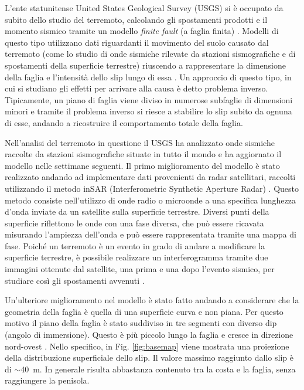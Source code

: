 L'ente statunitense United States Geological Survey (USGS) si è occupato da subito dello studio del terremoto, calcolando gli spostamenti prodotti e il momento sismico tramite un modello \textit{finite fault} (a faglia finita) \citep{usgs2025qw60finitefault}.
Modelli di questo tipo utilizzano dati riguardanti il movimento del suolo causato dal terremoto (come lo studio di onde sismiche rilevate da stazioni sismografiche e di spostamenti della superficie terrestre) riuscendo  a rappresentare la dimensione della faglia e l'intensità dello slip lungo di essa \citep{usgs_finite_fault}. Un approccio di questo tipo, in cui si studiano gli effetti per arrivare alla causa è detto problema inverso. Tipicamente, un piano di faglia viene diviso in numerose subfaglie di dimensioni minori e tramite il problema inverso si riesce a stabilire lo slip subito da ognuna di esse, andando a ricostruire il comportamento totale della faglia.

Nell'analisi del terremoto in questione il USGS ha analizzato onde sismiche raccolte da stazioni sismografiche situate in tutto il mondo e ha aggiornato il modello nelle settimane seguenti. Il primo miglioramento del modello è stato realizzato andando ad implementare dati provenienti da radar satellitari, raccolti utilizzando il metodo inSAR (Interferometric Synthetic Aperture Radar) \citep{hubbard2025kamchatkaupdates}. Questo metodo consiste nell'utilizzo di onde radio o microonde a una specifica lunghezza d'onda inviate da un satellite sulla superficie terrestre. Diversi punti della superficie riflettono le onde con una fase diversa, che può essere ricavata misurando l'ampiezza dell'onda e può essere rappresentata tramite una mappa di fase. Poiché un terremoto è un evento in grado di andare a modificare la superficie terrestre, è possibile realizzare un interferogramma tramite due immagini ottenute dal satellite, una prima e una dopo l'evento sismico, per studiare così gli spostamenti avvenuti \citep{hubbard2023inSAR}.

Un'ulteriore miglioramento nel modello è stato fatto andando a considerare che la geometria della faglia è quella di una superficie curva e non piana. Per questo motivo il piano della faglia è stato suddiviso in tre segmenti con diverso dip (angolo di immersione). Questo è più piccolo lungo la faglia e cresce in direzione nord-ovest \citep{hubbard2025aftershockupdate}.
Nello specifico, in Fig. \ref{fig:basemap} viene mostrata una proiezione della distribuzione superficiale dello slip. Il valore massimo raggiunto dallo slip è di \( \sim\)\qty{40}{\meter}. In generale risulta abbastanza contenuto tra la costa e la faglia, senza raggiungere la penisola.

